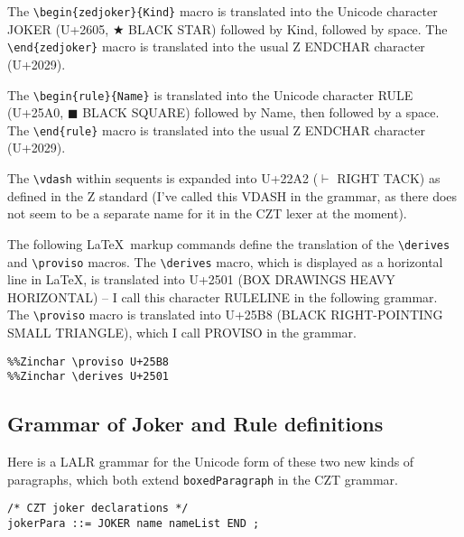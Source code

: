 \documentclass{article}
\newcommand{\derives}{\derive{}}
\newenvironment{zedjoker}[1]{\par$\bigstar$ #1\ }{}
\newcommand{\proviso}{\raisebox{0.5ex}{${}_{\blacktriangleright}\ $}}%
\begin{document}
The \verb!\begin{zedjoker}{Kind}! macro is translated into
the Unicode character JOKER (U+2605, $\bigstar$ BLACK STAR)
followed by Kind, followed by space.
The \verb!\end{zedjoker}! macro is translated into the usual
Z ENDCHAR character (U+2029).

The \verb!\begin{rule}{Name}! is translated into
the Unicode character RULE (U+25A0, $\blacksquare$ BLACK SQUARE)
followed by Name, then followed by a space.
The \verb!\end{rule}! macro is translated into the usual
Z ENDCHAR character (U+2029).

The \verb!\vdash! within sequents is expanded into U+22A2 ($\vdash$ RIGHT TACK)
as defined in the Z standard (I've called this VDASH in the grammar,
as there does not seem to be a separate name for it in the CZT lexer 
at the moment).

The following \LaTeX\ markup commands define the translation
of the \verb!\derives! and \verb!\proviso! macros.
The \verb!\derives! macro, which is displayed as a horizontal line in \LaTeX,
is translated into U+2501 (BOX DRAWINGS HEAVY HORIZONTAL) -- I call this
character RULELINE in the following grammar.  
The \verb!\proviso! macro is translated into U+25B8 (BLACK RIGHT-POINTING
SMALL TRIANGLE), which I call PROVISO in the grammar.


\begin{verbatim}
%%Zinchar \proviso U+25B8
%%Zinchar \derives U+2501
\end{verbatim}

\subsection{Grammar of Joker and Rule definitions}

Here is a LALR grammar for the Unicode form of these two
new kinds of paragraphs, which both extend \verb!boxedParagraph!
in the CZT grammar.
\begin{verbatim}
/* CZT joker declarations */
jokerPara ::= JOKER name nameList END ;
\end{verbatim}
\end{document}
